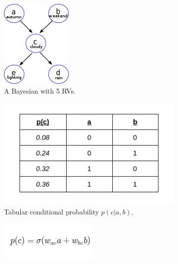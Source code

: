 \begin{figure}[h]
	\centering
	\begin{subfigure}[t]{.33\textwidth}
  		\centering
  		\includegraphics[width=.6\linewidth]{imgs/bayesnet1.png}
  		\caption{A Bayesian with 5 RVs.}
  		\label{fig:sub1}
	\end{subfigure}%
	\begin{subfigure}[t]{.33\textwidth}
  		\centering
  		\includegraphics[width=.9\linewidth]{imgs/bayesnet2.png}
  		\caption{Tabular conditional probability $p(c |a , b)$.}
  		\label{fig:sub2}
	\end{subfigure}
	\begin{subfigure}[t]{.33\textwidth}
  		\centering
  		\includegraphics[width=.7\linewidth]{imgs/bayesnet3.png}

\end{subfigure}
\end{figure}
